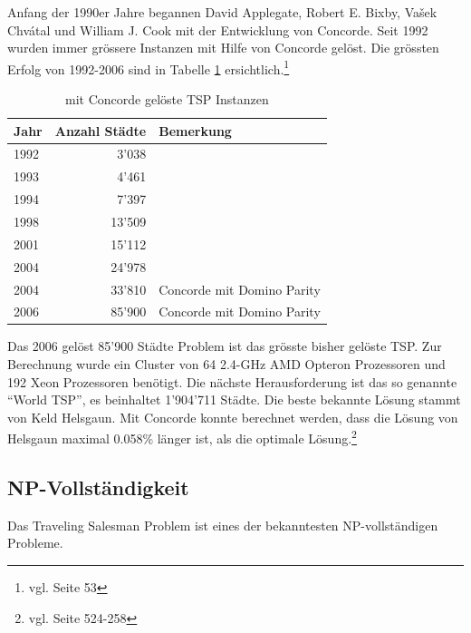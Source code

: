 \documentclass[11pt,a4paper]{article}
\begin{document}
Anfang der 1990er Jahre begannen David Applegate, Robert E. Bixby, Vašek Chvátal und William J. Cook mit der Entwicklung von Concorde. Seit 1992 wurden immer grössere Instanzen mit Hilfe von Concorde gelöst. Die grössten Erfolg von 1992-2006 sind in Tabelle \ref{tab:concorde_history} ersichtlich.\footnote{vgl. \cite{applegate06} Seite 53}

        \begin{table}[H]
                \centering
                \begin{tabular}{| l | r | l |}
                    \hline
                        Jahr    & Anzahl Städte & Bemerkung                 \\ \hline
                        1992    & 3'038         &                           \\ \hline
                        1993    & 4'461         &                           \\ \hline
                        1994    & 7'397         &                           \\ \hline
                        1998    & 13'509        &                           \\ \hline
                        2001    & 15'112        &                           \\ \hline
                        2004    & 24'978        &                           \\ \hline
                        2004    & 33'810        & Concorde mit Domino Parity \\ \hline
                        2006    & 85'900        & Concorde mit Domino Parity \\ \hline
                \end{tabular}
                \caption{mit Concorde gelöste TSP Instanzen}
                \label{tab:concorde_history}
        \end{table}

Das 2006 gelöst 85'900 Städte Problem ist das grösste bisher gelöste TSP. Zur Berechnung wurde ein Cluster von 64 2.4-GHz AMD Opteron Prozessoren und 192 Xeon Prozessoren benötigt.
Die nächste Herausforderung ist das so genannte "`World TSP"', es beinhaltet 1'904'711 Städte. Die beste bekannte Lösung stammt von Keld Helsgaun. Mit Concorde konnte berechnet werden, dass die Lösung von Helsgaun maximal 0.058\% länger ist, als die optimale Lösung.\footnote{vgl. \cite{applegate06} Seite 524-258}

\newpage

\subsection{NP-Vollständigkeit}
Das Traveling Salesman Problem ist eines der bekanntesten NP-vollständigen Probleme. 
\end{document}
